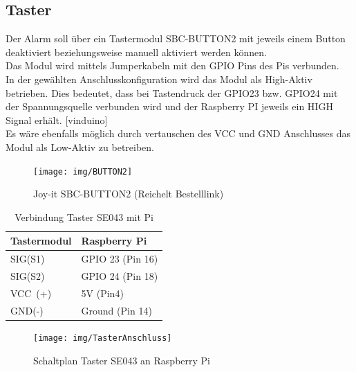 \documentclass[12pt,a4paper,openany]{scrbook}
\begin{document}
\subsection{Taster}

Der Alarm soll über ein Tastermodul SBC-BUTTON2 mit jeweils einem Button deaktiviert beziehungsweise manuell aktiviert werden können.\\ 
Das Modul wird mittels Jumperkabeln mit den GPIO Pins des Pis verbunden. \\ 
In der gewählten Anschlusskonfiguration wird das Modul als High-Aktiv betrieben. Dies bedeutet, dass bei Tastendruck der GPIO23 bzw. GPIO24 mit der Spannungsquelle verbunden wird und der Raspberry PI jeweils ein HIGH Signal erhält. [vinduino]\\ 
Es wäre ebenfalls möglich durch vertauschen des VCC und GND Anschlusses das Modul als Low-Aktiv zu betreiben.
	\begin{figure}[H]
	\centering
	\texttt{[image: img/BUTTON2]}
	\caption{Joy-it SBC-BUTTON2 (Reichelt Bestelllink)}
	\label{Bildlabel}
\end{figure}

\begin{table}[H]
	\centering
	\begin{tabular}{|p{5cm}|p{5cm}|} 
		\hline
		Tastermodul & Raspberry Pi  \\ 
		\hline
		SIG(S1)                   & GPIO 23 \hspace{0,3cm}(Pin 16)               \\ 
		\hline
		SIG(S2)                   & GPIO 24 \hspace{0,3cm}(Pin 18)           \\
		\hline
		VCC~(+)   & 5V \hspace{1,45cm}(Pin\hspace{0,35cm}4)            \\ 
		\hline
		GND(-)                   & Ground \hspace{0,6cm}(Pin 14)           \\
		\hline
		
\end{tabular}
	\caption{Verbindung Taster SE043 mit Pi} 
\end{table}




	\begin{figure}[H]
	\centering
	\texttt{[image: img/TasterAnschluss]}
	\caption{Schaltplan Taster SE043 an Raspberry Pi}
	\label{Bildlabel}
\end{figure}
\end{document}
